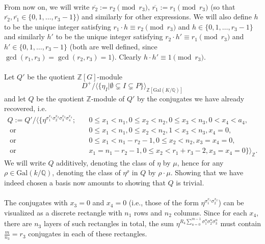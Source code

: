 \documentclass[12pt,a4paper]{article}
\theoremstyle{definition}
\newcommand{\Q}{\mathbb{Q}}
\newcommand{\Z}{\mathbb{Z}}
\newcommand{\Gal}{\mathrm{Gal}}
\newcommand{\uo}{\overline{r_2}}
\newcommand{\vo}{\overline{r_1}}
\begin{document}
\paragraph*{}
From now on, we will write $\uo:=r_2\pmod{r_3}$, $\vo:=r_1\pmod{r_3}$ (so that $\uo,\vo\in\{0,1,\dots,r_3-1\}$) and similarly for other expressions. We will also define $h$ to be the unique integer satisfying $ r_1\cdot h\equiv r_2\pmod{r_3}$ and $h\in\{0,1,\dots,r_3-1\}$ and similarly $h'$ to be the unique integer satisfying $ r_2\cdot h'\equiv r_1\pmod{r_3}$ and $h'\in\{0,1,\dots,r_3-1\}$ (both are well defined, since $\gcd(r_1,r_3)=\gcd(r_2,r_3)=1$). Clearly $h\cdot h'\equiv 1 \pmod{r_3}$.

\paragraph*{}
Let $Q'$ be the quotient $\Z[G]$-module $$D^+/\big\langle \{\eta_I \big\vert \emptyset \subsetneq I \subsetneq P \}\big\rangle_{\Z[\Gal(K/\Q)]}$$
and let $Q$ be the quotient $\Z$-module of $Q'$ by the conjugates we have already recovered, i.e.
\begin{align*}
Q:=Q'/\big\langle \{\eta^{\sigma_1^{x_1}\sigma_2^{x_2}\sigma_3^{x_3}\sigma_4^{x_4}}; \quad & 0\leq x_1< n_1, 0\leq x_2<n_2, 0\leq x_3<n_3,0< x_4<a_4,\\
\text { or }& 0\leq x_1< n_1, 0\leq x_2<n_2, 1< x_3<n_3,x_4=0,\\
\text { or }& 0\leq x_1< n_1-r_2-1, 0\leq x_2<n_2, x_3=x_4=0,\\
\text { or }& x_1= n_1-r_2-1, 0\leq x_2<r_1+r_3-2, x_3=x_4=0 \}\big\rangle_{\Z}.
\end{align*}
We will write $Q$ additively, denoting the class of $\eta$ by $\mu$, hence for any $\rho\in\Gal(k/\Q)$, denoting the class of $\eta^{\rho}$ in $Q$ by $\rho\cdot \mu$.
Showing that we have indeed chosen a basis now amounts to showing that $Q$ is trivial. 

\paragraph*{}
The conjugates with $x_3=0$ and $x_4=0$ (i.e., those of the form $\eta^{\sigma_1^{x_1}\sigma_2^{x_2}}$) can be visualized as a discrete rectangle with $n_1$ rows and $n_2$ columns. Since for each $x_4$, there are $n_3$ layers of such rectangles in total, the sum $\eta^{R_4\sum_{u=0}^{m-1}\sigma_1^{u}\sigma_2^{u}\sigma_3^{u}}$ must contain $\frac{m}{n_3}=r_3$ conjugates in each of these rectangles. 
\end{document}
